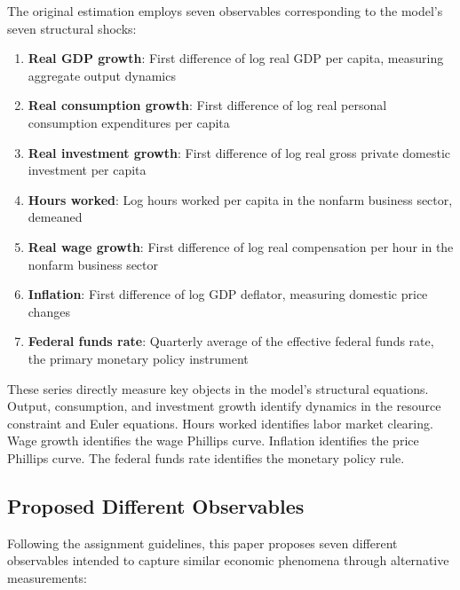\documentclass[12pt]{article}
\begin{document}
The original estimation employs seven observables corresponding to the model's seven structural shocks:
\begin{enumerate}
    \item \textbf{Real GDP growth}: First difference of log real GDP per capita, measuring aggregate output dynamics
    \item \textbf{Real consumption growth}: First difference of log real personal consumption expenditures per capita
    \item \textbf{Real investment growth}: First difference of log real gross private domestic investment per capita
    \item \textbf{Hours worked}: Log hours worked per capita in the nonfarm business sector, demeaned
    \item \textbf{Real wage growth}: First difference of log real compensation per hour in the nonfarm business sector
    \item \textbf{Inflation}: First difference of log GDP deflator, measuring domestic price changes
    \item \textbf{Federal funds rate}: Quarterly average of the effective federal funds rate, the primary monetary policy instrument
\end{enumerate}

These series directly measure key objects in the model's structural equations. Output, consumption, and investment growth identify dynamics in the resource constraint and Euler equations. Hours worked identifies labor market clearing. Wage growth identifies the wage Phillips curve. Inflation identifies the price Phillips curve. The federal funds rate identifies the monetary policy rule.

\subsection{Proposed Different Observables}

Following the assignment guidelines, this paper proposes seven different observables intended to capture similar economic phenomena through alternative measurements:
\end{document}

